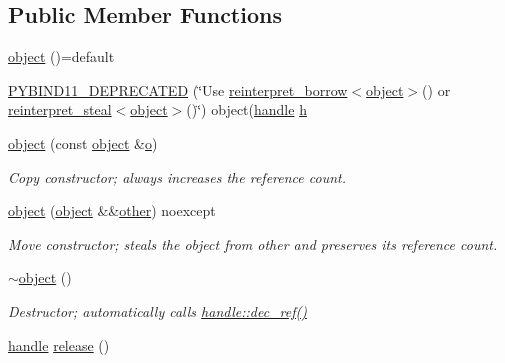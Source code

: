 \subsection*{Public Member Functions}
\begin{DoxyCompactItemize}
\item 
\mbox{\hyperlink{classobject_a9ac91a751171ebf7e3af73720238818e}{object}} ()=default
\item 
\mbox{\hyperlink{classobject_af2b49798a85dc52371995578108d84e1}{P\+Y\+B\+I\+N\+D11\+\_\+\+D\+E\+P\+R\+E\+C\+A\+T\+ED}} (\char`\"{}Use \mbox{\hyperlink{classobject_ac1ea1a4cbcf197d7c8096037633720d7}{reinterpret\+\_\+borrow}}$<$\mbox{\hyperlink{classobject}{object}}$>$() or \mbox{\hyperlink{classobject_ae1de2ab5a755c10582ac1e46071de5c5}{reinterpret\+\_\+steal}}$<$\mbox{\hyperlink{classobject}{object}}$>$()\char`\"{}) object(\mbox{\hyperlink{classhandle}{handle}} \mbox{\hyperlink{_s_d_l__opengl__glext_8h_afa0fb1b5e976920c0abeff2dca3ed774}{h}}
\item 
\mbox{\hyperlink{classobject_a6537d8aee1fc94555af84e5bb9ecad21}{object}} (const \mbox{\hyperlink{classobject}{object}} \&\mbox{\hyperlink{abstract_8h_a70a0763575096c5545f2232a32ec302a}{o}})
\begin{DoxyCompactList}\small\item\em Copy constructor; always increases the reference count. \end{DoxyCompactList}\item 
\mbox{\hyperlink{classobject_a3fc437bccb86b745433164bc3a04a2a4}{object}} (\mbox{\hyperlink{classobject}{object}} \&\&\mbox{\hyperlink{dictobject_8h_abd4733e17e86acb453bda62bc8b96adf}{other}}) noexcept
\begin{DoxyCompactList}\small\item\em Move constructor; steals the object from {\ttfamily other} and preserves its reference count. \end{DoxyCompactList}\item 
\mbox{\hyperlink{classobject_aecd824abdc96ff340acf4ea25a34d76d}{$\sim$object}} ()
\begin{DoxyCompactList}\small\item\em Destructor; automatically calls {\ttfamily \mbox{\hyperlink{classhandle_a03747f7b62a7b61eb7d9d1df25bfa7c4}{handle\+::dec\+\_\+ref()}}} \end{DoxyCompactList}\item 
\mbox{\hyperlink{classhandle}{handle}} \mbox{\hyperlink{classobject_a4ce66b1d44b37ae6b28e80228b075aae}{release}} ()
\item 

\end{DoxyCompactItemize}
